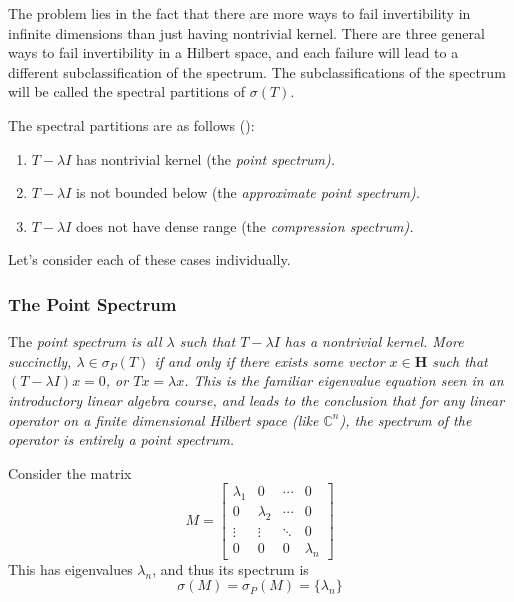 The problem lies in the fact that there are more ways to fail invertibility in
infinite dimensions than just having nontrivial kernel. There are three general
ways to fail invertibility in a Hilbert space, and each failure will lead to a
different subclassification of the spectrum. The subclassifications of the
spectrum will be called the spectral partitions of $\sigma(T)$.

The spectral partitions are as follows (\cite[p. 115]{MacCluer2009}):

\begin{enumerate}
    \itemsep0em
    \item $T-\lambda I$ has nontrivial kernel (the \em point spectrum\em).
    \item $T-\lambda I$ is not bounded below (the \em approximate point
        spectrum\em).
    \item $T-\lambda I$ does not have dense range (the \em compression
        spectrum\em).
\end{enumerate}

Let's consider each of these cases individually.

\subsubsection{The Point Spectrum}
The \em point spectrum \em is all $\lambda$ such that $T-\lambda I$ has a
nontrivial kernel. More succinctly, $\lambda \in \sigma_P(T)$ if and only if
there exists some vector $x\in \textbf{H}$ such that $(T-\lambda I)x = 0$, or
$Tx=\lambda x$.  This is the familiar eigenvalue equation seen in an
introductory linear algebra course, and leads to the conclusion that for any
linear operator on a finite dimensional Hilbert space (like $\mathbb{C}^n$), the
spectrum of the operator is entirely a point spectrum.
\begin{example}
    Consider the matrix
    \[
        M = 
            \begin{bmatrix}
                \lambda_1 & 0 & \cdots & 0 \\
                0 & \lambda_2 & \cdots & 0 \\
                \vdots & \vdots & \ddots & 0\\
                0 & 0 & 0 & \lambda_n 
            \end{bmatrix}
    \]
    This has eigenvalues $\lambda_n$, and thus its spectrum is
    \[
        \sigma(M) = \sigma_P(M) = \{\lambda_n\}
    \]
\end{example}

